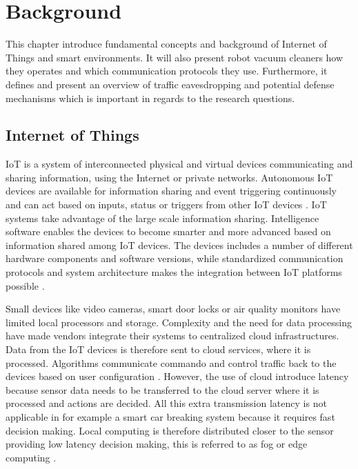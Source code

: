 \chapter{Background}
This chapter introduce fundamental concepts and background of Internet of Things and smart environments. It will also present robot vacuum cleaners how they operates and which communication protocols they use. Furthermore, it defines and present an overview of traffic eavesdropping and potential defense mechanisms which is important in regards to the research questions. 

\section{Internet of Things}
\gls{IoT} is a system of interconnected physical and virtual devices communicating and sharing information, using the Internet or private networks. Autonomous \gls{IoT} devices are available for information sharing and event triggering continuously and can act based on inputs, status or triggers from other \gls{IoT} devices \cite{atlam2020iot}. \gls{IoT} systems take advantage of the large scale information sharing. Intelligence software enables the devices to become smarter and more advanced based on information shared among \gls{IoT} devices. The devices includes a number of different hardware components and software versions, while standardized communication protocols and system architecture makes the integration between \gls{IoT} platforms possible \cite{atlam2020iot}. 

Small devices like video cameras, smart door locks or air quality monitors have limited local processors and storage. Complexity and the need for data processing have made vendors integrate their systems to centralized cloud infrastructures. Data from the \gls{IoT} devices is therefore sent to cloud services, where it is processed. Algorithms communicate commando and control traffic back to the devices based on user configuration \cite{pavelic2018internet}. However, the use of cloud introduce latency because sensor data needs to be transferred to the cloud server where it is processed and actions are decided. All this extra transmission latency is not applicable in for example a smart car breaking system because it requires fast decision making. Local computing is therefore distributed closer to the sensor providing low latency decision making, this is referred to as fog or edge computing \cite{mocrii2018iot}.   


